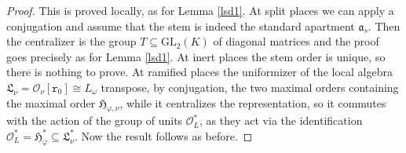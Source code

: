 \documentclass{article}
\theoremstyle{definition}
\theoremstyle{remark}
\begin{document}
\begin{proof}
This is proved locally, as for Lemma \ref{lsd1}. 
At split places
we can apply a conjugation and assume 
that the stem is indeed the
standard apartment $\mathfrak{a}_s$. Then the centralizer 
is the group $T\subseteq \mathrm{GL}_2(K)$ of diagonal 
matrices and the proof goes precisely as for Lemma \ref{lsd1}. 
At inert places the stem order is unique, 
so there is nothing to 
prove. At ramified places the uniformizer of the local algebra
$\mathfrak{L}_\nu=\mathcal{O}_\nu[\mathtt{r}_0]\cong L_\omega$
transpose, by conjugation, the two maximal orders containing 
the maximal order $\mathfrak{H}_{\varphi,\nu}$, 
while it centralizes
the representation, so it commutes with the action of the group
of units $\mathcal{O}_L^*$, as they act via the identification
$\mathcal{O}_L^*=\mathfrak{H}_\varphi^*\subseteq
\mathfrak{L}_\nu^*$. 
Now the result follows as before.
\end{proof}
\end{document}
